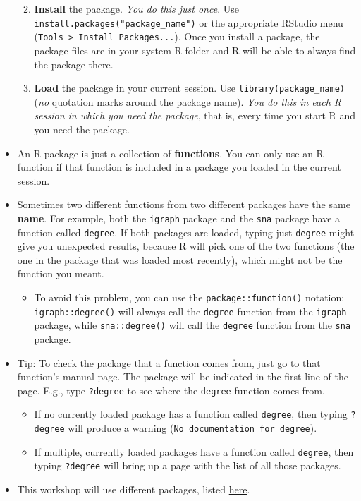 \documentclass[
]{book}
\providecommand{\tightlist}{%
  \setlength{\itemsep}{0pt}\setlength{\parskip}{0pt}}
\begin{document}
\begin{itemize}
  \begin{enumerate}
  \def\labelenumi{\arabic{enumi}.}
  \tightlist
  \item
    \textbf{Install} the package. \emph{You do this just once}. Use \texttt{install.packages("package\_name")} or the appropriate RStudio menu (\texttt{Tools\ \textgreater{}\ Install\ Packages...}). Once you install a package, the package files are in your system R folder and R will be able to always find the package there.
  \item
    \textbf{Load} the package in your current session. Use \texttt{library(package\_name)} (\emph{no} quotation marks around the package name). \emph{You do this in each R session in which you need the package}, that is, every time you start R and you need the package.
  \end{enumerate}
\item
  An R package is just a collection of \textbf{functions}. You can only use an R function if that function is included in a package you loaded in the current session.
\item
  Sometimes two different functions from two different packages have the same \textbf{name}. For example, both the \texttt{igraph} package and the \texttt{sna} package have a function called \texttt{degree}. If both packages are loaded, typing just \texttt{degree} might give you unexpected results, because R will pick one of the two functions (the one in the package that was loaded most recently), which might not be the function you meant.

  \begin{itemize}
  \tightlist
  \item
    To avoid this problem, you can use the \texttt{package::function()} notation: \texttt{igraph::degree()} will always call the \texttt{degree} function from the \texttt{igraph} package, while \texttt{sna::degree()} will call the \texttt{degree} function from the \texttt{sna} package.
  \end{itemize}
\item
  Tip: To check the package that a function comes from, just go to that function's manual page. The package will be indicated in the first line of the page. E.g., type \texttt{?degree} to see where the \texttt{degree} function comes from.

  \begin{itemize}
  \tightlist
  \item
    If no currently loaded package has a function called \texttt{degree}, then typing \texttt{?degree} will produce a warning (\texttt{No\ documentation\ for\ \textquotesingle{}degree\textquotesingle{}}).
  \item
    If multiple, currently loaded packages have a function called \texttt{degree}, then typing \texttt{?degree} will bring up a page with the list of all those packages.
  \end{itemize}
\item
  This workshop will use different packages, listed \protect\hyperlink{packages}{here}.
\end{itemize}
\end{document}
